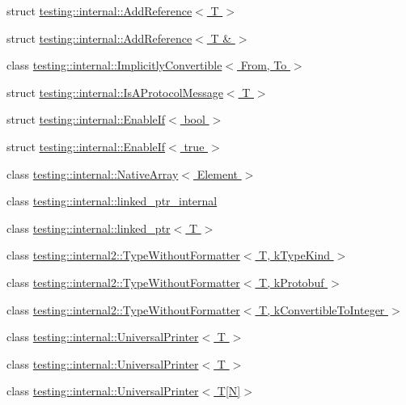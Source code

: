 \begin{DoxyCompactItemize}
\item 
struct \hyperlink{structtesting_1_1internal_1_1_add_reference}{testing\-::internal\-::\-Add\-Reference$<$ T $>$}
\item 
struct \hyperlink{structtesting_1_1internal_1_1_add_reference_3_01_t_01_6_01_4}{testing\-::internal\-::\-Add\-Reference$<$ T \& $>$}
\item 
class \hyperlink{classtesting_1_1internal_1_1_implicitly_convertible}{testing\-::internal\-::\-Implicitly\-Convertible$<$ From, To $>$}
\item 
struct \hyperlink{structtesting_1_1internal_1_1_is_a_protocol_message}{testing\-::internal\-::\-Is\-A\-Protocol\-Message$<$ T $>$}
\item 
struct \hyperlink{structtesting_1_1internal_1_1_enable_if}{testing\-::internal\-::\-Enable\-If$<$ bool $>$}
\item 
struct \hyperlink{structtesting_1_1internal_1_1_enable_if_3_01true_01_4}{testing\-::internal\-::\-Enable\-If$<$ true $>$}
\item 
class \hyperlink{classtesting_1_1internal_1_1_native_array}{testing\-::internal\-::\-Native\-Array$<$ Element $>$}
\item 
class \hyperlink{classtesting_1_1internal_1_1linked__ptr__internal}{testing\-::internal\-::linked\-\_\-ptr\-\_\-internal}
\item 
class \hyperlink{classtesting_1_1internal_1_1linked__ptr}{testing\-::internal\-::linked\-\_\-ptr$<$ T $>$}
\item 
class \hyperlink{classtesting_1_1internal2_1_1_type_without_formatter}{testing\-::internal2\-::\-Type\-Without\-Formatter$<$ T, k\-Type\-Kind $>$}
\item 
class \hyperlink{classtesting_1_1internal2_1_1_type_without_formatter_3_01_t_00_01k_protobuf_01_4}{testing\-::internal2\-::\-Type\-Without\-Formatter$<$ T, k\-Protobuf $>$}
\item 
class \hyperlink{classtesting_1_1internal2_1_1_type_without_formatter_3_01_t_00_01k_convertible_to_integer_01_4}{testing\-::internal2\-::\-Type\-Without\-Formatter$<$ T, k\-Convertible\-To\-Integer $>$}
\item 
class \hyperlink{classtesting_1_1internal_1_1_universal_printer}{testing\-::internal\-::\-Universal\-Printer$<$ T $>$}
\item 
class \hyperlink{classtesting_1_1internal_1_1_universal_printer}{testing\-::internal\-::\-Universal\-Printer$<$ T $>$}
\item 
class \hyperlink{classtesting_1_1internal_1_1_universal_printer_3_01_t[_n]_4}{testing\-::internal\-::\-Universal\-Printer$<$ T\mbox{[}\-N\mbox{]}$>$}

\end{DoxyCompactItemize}
